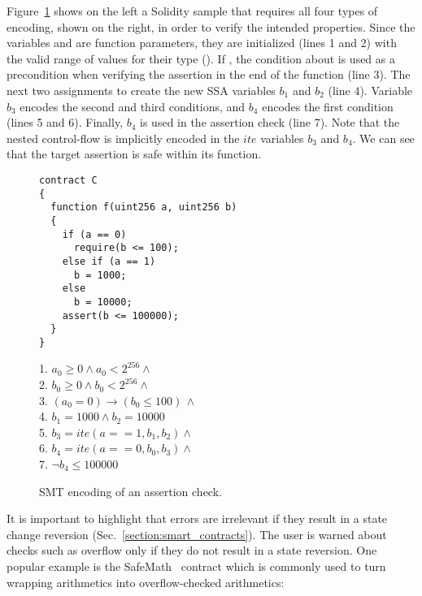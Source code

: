 Figure~\ref{figure:solidity_encoding_1} shows on the left a Solidity sample
that requires all four types of encoding, shown on the right, in order to
verify the intended properties.
%
Since the variables  and  are function
parameters, they are initialized (lines 1 and 2) with the valid range of values
for their type ().
%
If , the  condition about  is used as a
precondition when verifying the assertion in the end of the function (line 3).
%
The next two assignments to  create the new SSA variables
$b_1$ and $b_2$ (line 4).
%
Variable $b_3$ encodes the second and third conditions, and $b_4$
encodes the first condition (lines 5 and 6).
%
Finally, $b_4$ is used in the assertion check (line 7).
%
Note that the nested control-flow is implicitly encoded in the $ite$
variables $b_3$ and $b_4$.
%
We can see that the target assertion is safe within its function.

\begin{figure}
\label{figure:solidity_encoding_1}
\noindent\begin{minipage}{.48\textwidth}
\begin{verbatim}
contract C
{
  function f(uint256 a, uint256 b)
  {
    if (a == 0)
      require(b <= 100);
    else if (a == 1)
      b = 1000;
    else
      b = 10000;
    assert(b <= 100000);
  }
}
\end{verbatim}
\end{minipage}\hfill
\begin{minipage}{.48\textwidth}
1. $a_0 \ge 0 \land a_0 < 2^{256}  \land \phantom{x}$\\
2. $b_0 \ge 0 \land b_0 < 2^{256}  \land \phantom{x}$\\
3. $(a_0 = 0) \rightarrow (b_0 \le 100) \, \land$\\
4. $b_1 = 1000 \land b_2 = 10000$\\
5. $b_3 = ite(a == 1, b_1, b_2) \land \phantom{x}$\\
6. $b_4 = ite(a == 0, b_0, b_3) \land \phantom{x}$\\
7. $\neg b_4 \le 100000$
\end{minipage}
\caption{SMT encoding of an assertion check.}
\end{figure}

It is important to highlight that errors are irrelevant if they result in a
state change reversion (Sec.~\ref{section:smart_contracts}). The user is warned
about checks such as overflow only if they do not result in a state reversion.
%
One popular example is the SafeMath~\cite{SafeMath} contract which
is commonly used to turn wrapping arithmetics into overflow-checked arithmetics:

